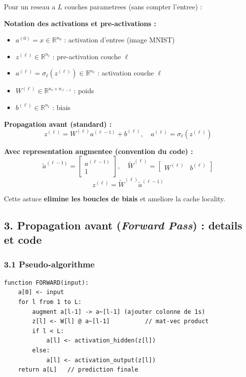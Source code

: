 \documentclass[
  letterpaper,
  DIV=11,
  numbers=noendperiod]{scrartcl}
\providecommand{\tightlist}{%
  \setlength{\itemsep}{0pt}\setlength{\parskip}{0pt}}
\begin{document}
Pour un reseau a \(L\) couches parametrees (sans compter l'entree) :

\textbf{Notation des activations et pre-activations :}
\begin{itemize}
\tightlist
\item \(a^{(0)} = x \in \mathbb{R}^{n_0}\) : activation d'entree (image MNIST)
\item \(z^{(\ell)} \in \mathbb{R}^{n_\ell}\) : pre-activation couche \(\ell\)
\item \(a^{(\ell)} = \sigma_\ell(z^{(\ell)}) \in \mathbb{R}^{n_\ell}\) : activation couche \(\ell\)
\item \(W^{(\ell)} \in \mathbb{R}^{n_\ell \times n_{\ell-1}}\) : poids
\item \(b^{(\ell)} \in \mathbb{R}^{n_\ell}\) : biais
\end{itemize}

\textbf{Propagation avant (standard) :}
\[z^{(\ell)} = W^{(\ell)} a^{(\ell-1)} + b^{(\ell)}, \quad a^{(\ell)} = \sigma_\ell(z^{(\ell)})\]

\textbf{Avec representation augmentee (convention du code) :}
\[\tilde{a}^{(\ell-1)} = \begin{bmatrix} a^{(\ell-1)} \\ 1 \end{bmatrix}, \quad \tilde{W}^{(\ell)} = \begin{bmatrix} W^{(\ell)} & b^{(\ell)} \end{bmatrix}\]
\[z^{(\ell)} = \tilde{W}^{(\ell)} \tilde{a}^{(\ell-1)}\]

Cette astuce \textbf{elimine les boucles de biais} et ameliore la cache locality.

\subsection{3. Propagation avant (\emph{Forward Pass}) : details et code}\label{propagation-avant}

\subsubsection{3.1 Pseudo-algorithme}\label{pseudo-algorithme}

\begin{verbatim}
function FORWARD(input):
    a[0] <- input
    for l from 1 to L:
        augment a[l-1] -> a~[l-1] (ajouter colonne de 1s)
        z[l] <- W[l] @ a~[l-1]          // mat-vec product
        if l < L:
            a[l] <- activation_hidden(z[l])
        else:
            a[l] <- activation_output(z[l])
    return a[L]   // prediction finale
\end{verbatim}
\end{document}
